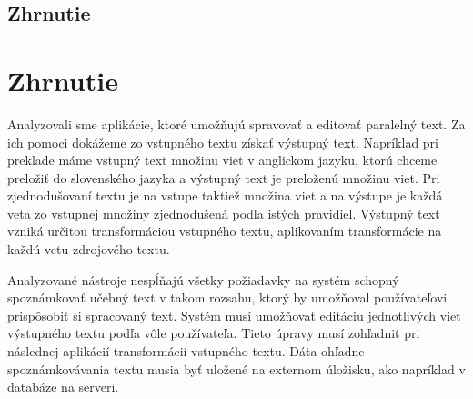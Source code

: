%
%
{
	\subsection{Zhrnutie}
}
{
	\section{Zhrnutie}
}
\label{subsection:analysis2:zhrnutie}
Analyzovali sme aplikácie, ktoré umožňujú spravovať a editovať paralelný text. Za ich pomoci dokážeme zo vstupného textu získať výstupný text. Napríklad pri preklade máme vstupný text množinu viet v anglickom jazyku, ktorú chceme preložiť do slovenského jazyka a výstupný text je preloženú množinu viet. Pri zjednodušovaní textu je na vstupe taktiež množina viet a na výstupe je každá veta zo vstupnej množiny zjednodušená podľa istých pravidiel. Výstupný text vzniká určitou transformáciou vstupného textu, aplikovaním transformácie na každú vetu zdrojového textu.

Analyzované nástroje nespĺňajú všetky požiadavky na systém schopný spoznámkovať učebný text v takom rozsahu, ktorý by umožňoval používateľovi prispôsobiť si spracovaný text. Systém musí umožňovať editáciu jednotlivých viet výstupného textu podľa vôle používateľa. Tieto úpravy musí zohľadniť pri následnej aplikácií transformácií vstupného textu. Dáta ohľadne spoznámkovávania textu musia byť uložené na externom úložisku, ako napríklad v databáze na serveri.
